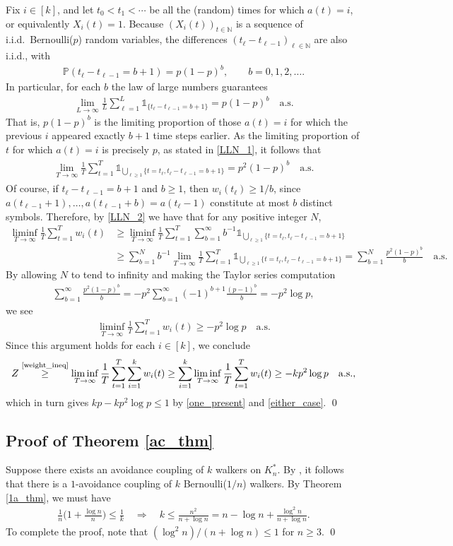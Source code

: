 \documentclass[11pt,reqno]{amsart} %
\newcommand{\one}{\mathds{1}}
\numberwithin{equation}{section}
\newcommand{\eq}[1]{\begin{align*} #1 \end{align*}}
\newcommand{\eeq}[1]{\begin{align} \begin{split} #1 \end{split} \end{align}}
\newcommand{\N}{\mathbb{N}}
\renewcommand{\P}{\mathbb{P}}
\theoremstyle{definition}
\begin{document}
Fix $i \in [k]$, and let $t_0 < t_1 < \cdots$ be all the (random) times for which $a(t) = i$, or equivalently $X_i(t) = 1$.
Because $(X_i(t))_{t\in\N}$ is a sequence of i.i.d.~Bernoulli($p$) random variables, the differences $(t_\ell-t_{\ell-1})_{\ell\in\N}$ are also i.i.d., with
\eq{
\P(t_\ell-t_{\ell-1} = b+1) = p(1-p)^b, \qquad b = 0,1,2,\dots.
}
In particular, for each $b$ the law of large numbers guarantees
\eq{
\lim_{L\to\infty} \frac{1}{L}\sum_{\ell=1}^L \one_{\{t_\ell-t_{\ell-1}=b+1\}} = p(1-p)^b \quad \mathrm{a.s.}
}
That is, $p(1-p)^b$ is the limiting proportion of those $a(t) = i$ for which the previous $i$ appeared exactly $b+1$ time steps earlier.
As the limiting proportion of $t$ for which $a(t) = i$ is precisely $p$, as stated in \eqref{LLN_1},
it follows that
\eeq{
\lim_{T\to\infty} \frac{1}{T}\sum_{t=1}^T \one_{\bigcup_{\ell \geq 1} \{t = t_\ell, t_\ell-t_{\ell-1} = b+1\}} = p^2(1-p)^b \quad \mathrm{a.s.} \label{LLN_2}
}
Of course, if $t_\ell - t_{\ell-1} = b+1$ and $b \geq 1$, then $w_i(t_\ell) \geq 1/b$, since $a(t_{\ell-1}+1),\dots,a(t_{\ell-1}+b)=a(t_\ell-1)$ constitute at most $b$ distinct symbols.
Therefore, by \eqref{LLN_2} we have that for any positive integer $N$,
\eq{
\liminf_{T\to\infty} \frac{1}{T}\sum_{t=1}^T w_i(t) 
&\geq \liminf_{T\to\infty} \frac{1}{T}\sum_{t=1}^T \sum_{b = 1}^\infty b^{-1}\one_{\bigcup_{\ell \geq 1} \{t = t_\ell, t_\ell-t_{\ell-1} = b+1\}} \\
&\geq \sum_{b = 1}^N b^{-1} \lim_{T\to\infty} \frac{1}{T} \sum_{t=1}^T \one_{\bigcup_{\ell \geq 1} \{t = t_\ell, t_\ell-t_{\ell-1} = b+1\}} 
=\sum_{b=1}^N \frac{p^2(1-p)^b}{b} \quad \mathrm{a.s.}
}
By allowing $N$ to tend to infinity and making the Taylor series computation
\eq{
\sum_{b = 1}^\infty \frac{p^2(1-p)^b}{b} = -p^2\sum_{b=1}^\infty (-1)^{b+1}\frac{(p-1)^b}{b} = -p^2\log p,
}
we see
\eq{
\liminf_{T \to \infty} \frac{1}{T}\sum_{t=1}^T w_i(t) \geq -p^2\log p \quad \mathrm{a.s.}
}
Since this argument holds for each $i \in [k]$, we conclude 
\eq{
Z \stackrel{\mbox{\scriptsize\eqref{weight_ineq}}}{\geq} 
\liminf_{T\to\infty}\frac{1}{T} \sum_{t=1}^T \sum_{i=1}^k w_i(t) \geq 
\sum_{i = 1}^k \liminf_{T\to\infty}\frac{1}{T}\sum_{t=1}^T w_i(t) \geq -kp^2\log p \quad \mathrm{a.s.},
} 
which in turn gives $kp -kp^2\log p \leq 1$ by \eqref{one_present} and \eqref{either_case}.
\qed


\subsection{Proof of Theorem \ref{ac_thm}} \label{proof_2}
Suppose there exists an avoidance coupling of $k$ walkers on $K_n^*$.
By \cite[Lemma 5.2]{angel-holroyd-martin-wilson-winkler13}, it follows that there is a $1$-avoidance coupling of $k$ Bernoulli($1/n$) walkers.
By Theorem \ref{1a_thm}, we must have
\eq{
\frac{1}{n}\Big(1 + \frac{\log n}{n}\Big) \leq \frac{1}{k} \quad \Rightarrow \quad
k \leq \frac{n^2}{n+\log n} = n - \log n + \frac{\log^2 n}{n+\log n}.
}
To complete the proof, note that $(\log^2 n)/(n+\log n) \leq 1$ for $n\geq 3$.
\qed
\end{document}
